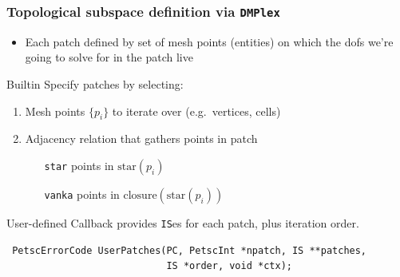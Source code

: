 \documentclass[presentation,aspectratio=43,10pt]{beamer}
\begin{document}
\begin{frame}[fragile]
 \frametitle{Topological subspace definition via \texttt{DMPlex}}
 \begin{itemize}
 \item Each patch defined by set of mesh points (entities) on which the dofs
   we're going to solve for in the patch live
 \end{itemize}
 \begin{block}{Builtin}
   Specify patches by selecting:
   \begin{enumerate}
   \item Mesh points $\{p_i\}$ to iterate over (e.g.~vertices, cells)
   \item Adjacency relation that gathers points in patch
     \begin{itemize}
     \item[\texttt{star}] points in $\text{star}(p_i)$
     \item[\texttt{vanka}] points in $\text{closure}(\text{star}(p_i))$
     \end{itemize}
   \end{enumerate}
 \end{block}
 \begin{block}{User-defined}
   Callback provides \texttt{IS}es for each patch, plus iteration order.
\begin{verbatim}
 PetscErrorCode UserPatches(PC, PetscInt *npatch, IS **patches, 
                            IS *order, void *ctx);
\end{verbatim}
 \end{block}
\end{frame}
\end{document}
